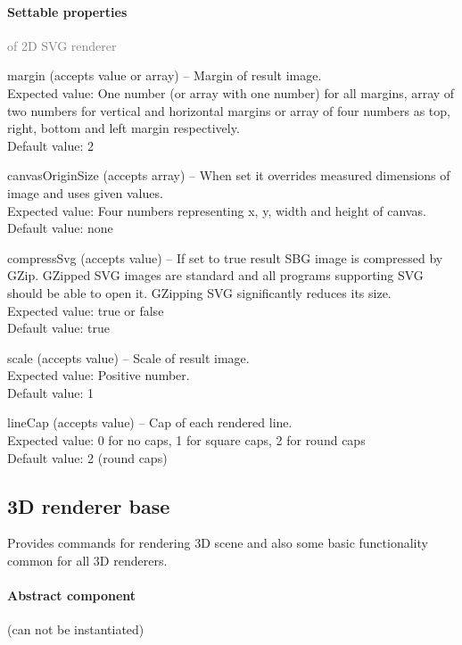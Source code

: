 	\paragraph{Settable properties}\textcolor{gray}{of 2D SVG renderer}
	\begin{description*}
		\item[margin]
		(accepts value or array)
			-- Margin of result image.
			\\ Expected value: One number (or array with one number) for all margins, array of two numbers for vertical and horizontal margins
            or array of four numbers as top, right, bottom and left margin respectively.
			\\ Default value: 2
		\item[canvasOriginSize]
		(accepts array)
			-- When set it overrides measured dimensions of image and uses given values.
			\\ Expected value: Four numbers representing x, y, width and height of canvas.
			\\ Default value: none
		\item[compressSvg]
		(accepts value)
			-- If set to true result SBG image is compressed by GZip.
            GZipped SVG images are standard and all programs supporting SVG should be able to open it.
            GZipping SVG significantly reduces its size.
			\\ Expected value: true or false
			\\ Default value: true
		\item[scale]
		(accepts value)
			-- Scale of result image.
			\\ Expected value: Positive number.
			\\ Default value: 1
		\item[lineCap]
		(accepts value)
			-- Cap of each rendered line.
			\\ Expected value: 0 for no caps, 1 for square caps, 2 for round caps
			\\ Default value: 2 (round caps)
	\end{description*}
	


\subsection{3D renderer base}
\label{Malsys.Processing.Components.Renderers.BaseRenderer3D}
Provides commands for rendering 3D scene and also
            some basic functionality common for all 3D renderers.	\paragraph{Abstract component} (can not be instantiated)
